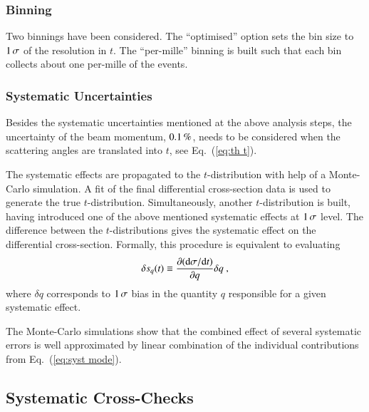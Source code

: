 \subsubsection{Binning}
\label{sec:binning}

Two binnings have been considered. The ``optimised'' option sets the bin size to $1\,{\rm \sigma}$ of the resolution in $t$. The ``per-mille'' binning is built such that each bin collects about one per-mille of the events.



\subsubsection{Systematic Uncertainties}
\label{sec:systematics}

Besides the systematic uncertainties mentioned at the above analysis steps, the uncertainty of the beam momentum, $0.1\,{\rm \%}$, needs to be considered when the scattering angles are translated into $t$, see Eq.~(\ref{eq:th t}).

The systematic effects are propagated to the $t$-distribution with help of a Monte-Carlo simulation. A fit of the final differential cross-section data is used to generate the true $t$-distribution. Simultaneously, another $t$-distribution is built, having introduced one of the above mentioned systematic effects at $1\,{\rm \sigma}$ level. The difference between the $t$-distributions gives the systematic effect on the differential cross-section. Formally, this procedure is equivalent to evaluating
\begin{equation}
\label{eq:syst mode}
\delta s_{q}(t) \equiv \frac{\partial({\rm d}\sigma/{\rm d} t)}{\partial q} \delta q\ ,
\end{equation}
where $\delta q$ corresponds to $1\,{\rm \sigma}$ bias in the quantity $q$ responsible for a given systematic effect.

The Monte-Carlo simulations show that the combined effect of several systematic errors is well approximated by linear combination of the individual contributions from Eq.~(\ref{eq:syst mode}).



\subsection{Systematic Cross-Checks}
\label{sec:cross checks}

